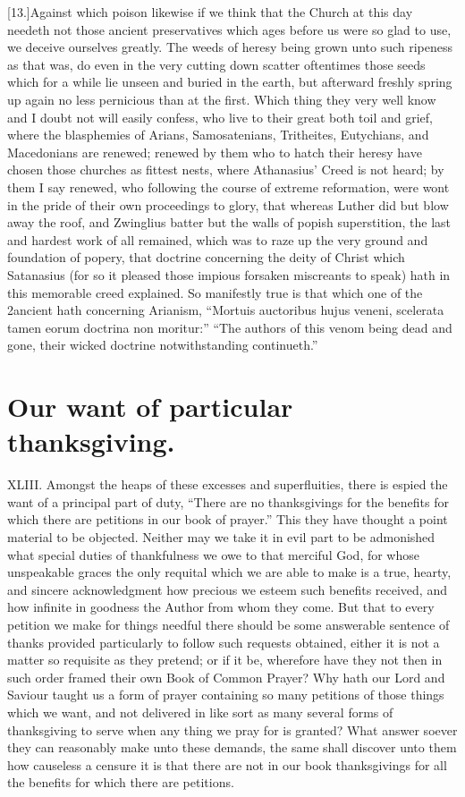 [13.]Against which poison likewise if we think that the Church at this day needeth not those ancient preservatives which ages before us were so glad to use, we deceive ourselves greatly. The weeds of heresy being grown unto such ripeness as that was, do even in the very cutting down scatter oftentimes those seeds which for a while lie unseen and buried in the earth, but afterward freshly spring up again no less pernicious than at the first. Which thing they very well know and I doubt not will easily confess, who live to their great both toil and grief, where the blasphemies of Arians, Samosatenians, Tritheites, Eutychians, and Macedonians are renewed;  renewed by them who to hatch their heresy have chosen those churches as fittest nests, where Athanasius’ Creed is not heard; by them I say renewed, who following the course of extreme reformation, were wont in the pride of their own proceedings to glory, that whereas Luther did but blow away  the roof,
 and Zwinglius batter but the walls of popish superstition, the last and hardest work of all remained, which was to raze up the very ground and foundation of popery, that doctrine concerning the deity of Christ which Satanasius (for so it pleased those impious forsaken miscreants to speak) hath in this memorable creed explained. So manifestly true is that which one of the 2ancient hath concerning Arianism, “Mortuis auctoribus hujus veneni, scelerata tamen eorum doctrina non moritur:” “The authors of this venom being dead and gone, their wicked doctrine notwithstanding continueth.”


\section*{Our want of particular thanksgiving.}
XLIII. Amongst the heaps of these excesses and superfluities, there is espied the want of a principal part of duty, “There are no thanksgivings for the benefits for which there are petitions in our book of prayer.” This they have thought a point material to be objected. Neither may we take it in evil part to be admonished what special duties of thankfulness we owe to that merciful God, for whose unspeakable graces the only requital which we are able to make is a true, hearty, and sincere acknowledgment how precious we esteem such benefits received, and how infinite in goodness the Author  from whom they come.
 But that to every petition we make for things needful there should be some answerable sentence of thanks provided particularly to follow such requests obtained, either it is not a matter so requisite as they pretend; or if it be, wherefore have they not then in such order framed their own Book of Common Prayer? Why hath our Lord and Saviour taught us a form of prayer containing so many petitions of those things which we want, and not delivered in like sort as many several forms of thanksgiving to serve when any thing we pray for is granted? What answer soever they can reasonably make unto these demands, the same shall discover unto them how causeless a censure it is that there are not in our book thanksgivings for all the benefits for which there are petitions.

